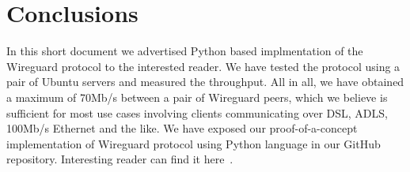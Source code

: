 \section{Conclusions}
\label{section:conclusion}

In this short document we advertised Python based implmentation of the 
Wireguard protocol to the interested reader. We have tested the protocol using a pair of 
Ubuntu servers and measured the throughput. All in all, we have 
obtained a maximum of 70Mb/s between a pair of Wireguard peers, 
which we believe is sufficient for most use cases involving 
clients communicating over DSL, ADLS, 100Mb/s Ethernet and the 
like. We have exposed our proof-of-a-concept implementation of 
Wireguard protocol using Python language in our GitHub repository.
Interesting reader can find it here~\cite{wireguard:poci}.